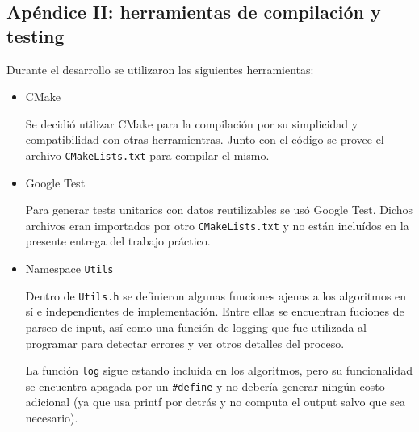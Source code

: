 	\subsection{Apéndice II: herramientas de compilación y testing}
	Durante el desarrollo se utilizaron las siguientes herramientas:

	\begin{itemize}
		\item CMake

		Se decidió utilizar CMake para la compilación por su simplicidad y compatibilidad con otras herramientras. Junto con el código se provee el archivo \texttt{CMakeLists.txt} para compilar el mismo.

		\item Google Test

		Para generar tests unitarios con datos reutilizables se usó Google Test. Dichos archivos eran importados por otro \texttt{CMakeLists.txt} y no están incluídos en la presente entrega del trabajo práctico.

		\item Namespace \texttt{Utils}

		Dentro de \texttt{Utils.h} se definieron algunas funciones ajenas a los algoritmos en sí e independientes de implementación. Entre ellas se encuentran fuciones de parseo de input, así como una función de logging que fue utilizada al programar para detectar errores y ver otros detalles del proceso.

		La función \texttt{log} sigue estando incluída en los algoritmos, pero su funcionalidad se encuentra apagada por un \texttt{\#define} y no debería generar ningún costo adicional (ya que usa printf por detrás y no computa el output salvo que sea necesario).
	\end{itemize}